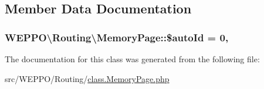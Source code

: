 \subsection{Member Data Documentation}
\subsubsection[{\texorpdfstring{\$auto\+Id}{$autoId}}]{\setlength{\rightskip}{0pt plus 5cm}W\+E\+P\+P\+O\textbackslash{}\+Routing\textbackslash{}\+Memory\+Page\+::\$auto\+Id = 0\hspace{0.3cm}{\ttfamily [static]}, {\ttfamily [protected]}}\hypertarget{classWEPPO_1_1Routing_1_1MemoryPage_a74bffbb9caf784787612da68004fff42}{}\label{classWEPPO_1_1Routing_1_1MemoryPage_a74bffbb9caf784787612da68004fff42}


The documentation for this class was generated from the following file\+:\begin{DoxyCompactItemize}
\item 
src/\+W\+E\+P\+P\+O/\+Routing/\hyperlink{class_8MemoryPage_8php}{class.\+Memory\+Page.\+php}\end{DoxyCompactItemize}
